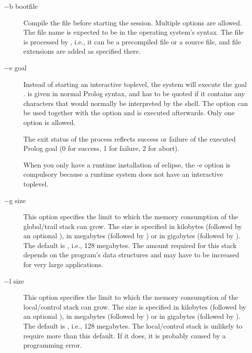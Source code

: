 \begin{description}
\item[$-$b bootfile]
Compile the file  before starting the session.
Multiple  options are allowed.
The file name is expected to be in the operating system's syntax.
The file is processed by
,
i.e., it can be a precompiled file or a source file, and file extensions
are added as specified there.

\item[$-$e goal]
Instead of starting an interactive toplevel, the system will execute the
goal .  is given in normal Prolog syntax, and has
to be
quoted if it contains any characters that would normally be interpreted by the
shell. The  option can be used together with the 
option and is executed
afterwards. Only one  option is allowed.

The exit status of the {\eclipse} process reflects success or failure of the
executed Prolog goal (0 for success, 1 for failure, 2 for abort).

When you only have a runtime installation of eclipse, the -e option
is compulsory because a runtime system does not have an interactive
toplevel.


\item[$-$g size]
This option specifies the limit to which the memory consumption of the
{\eclipse} global/trail stack can grow.
The size is specified in kilobytes (followed by an optional ), in
megabytes
(followed by ) or in gigabytes (followed by ).
The default is , i.e., 128 megabytes.
The amount required for this stack depends on the program's data
structures and may have to be increased for very large applications.

\item[$-$l size]
This option specifies the limit to which the memory consumption of the
{\eclipse} local/control stack can grow.
The size is specified in kilobytes (followed by an optional ), in
megabytes
(followed by ) or in gigabytes (followed by ).
The default is , i.e., 128 megabytes.
The local/control stack is unlikely to require more than this default.
If it does, it is probably caused by a programming error.


\end{description}
